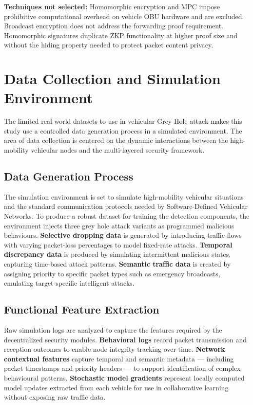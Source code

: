 \documentclass[12pt, a4paper]{report}
\newcommand{\mypar}{\vspace{0.8em}\noindent}
\begin{document}
\mypar
\textbf{Techniques not selected:} Homomorphic encryption and MPC impose
prohibitive computational overhead on vehicle OBU hardware and are excluded.
Broadcast encryption does not address the forwarding proof requirement. Homomorphic
signatures duplicate ZKP functionality at higher proof size and without the
hiding property needed to protect packet content privacy.

\section{Data Collection and Simulation Environment}

The limited real world datasets to use in vehicular Grey Hole attack makes this study use a controlled data generation process in a simulated environment. The area of data collection is centered on the dynamic interactions between the high-mobility vehicular nodes and the multi-layered security framework.


\subsection{Data Generation Process}

The simulation environment is set to simulate high-mobility vehicular situations and the standard communication protocols needed by Software-Defined Vehicular Networks. To produce a robust dataset for training the detection components, the environment injects three grey hole attack variants as programmed malicious behaviours.
\textbf{Selective dropping data} is generated by introducing traffic flows with varying packet-loss percentages to model fixed-rate attacks.
\textbf{Temporal discrepancy data} is produced by simulating intermittent malicious states, capturing time-based attack patterns.
\textbf{Semantic traffic data} is created by assigning priority to specific packet types such as emergency broadcasts, emulating target-specific intelligent attacks.


\subsection{Functional Feature Extraction}

Raw simulation logs are analyzed to capture the features required by the decentralized security modules.
\textbf{Behavioral logs} record packet transmission and reception outcomes to enable node integrity tracking over time.
\textbf{Network contextual features} capture temporal and semantic metadata — including packet timestamps and priority headers — to support identification of complex behavioural patterns.
\textbf{Stochastic model gradients} represent locally computed model updates extracted from each vehicle for use in collaborative learning without exposing raw traffic data.
\end{document}
